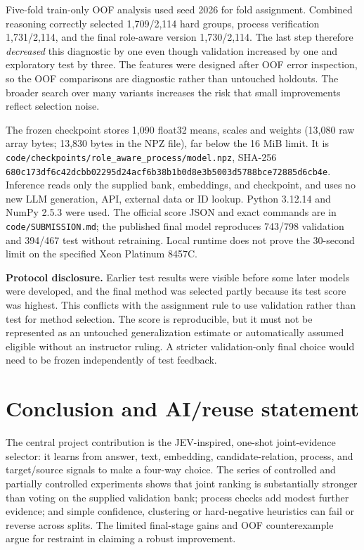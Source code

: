 \documentclass[10pt,a4paper]{article}
\newcommand{\code}[1]{\texttt{#1}}
\begin{document}
Five-fold train-only OOF analysis used seed 2026 for fold assignment. Combined reasoning correctly selected 1,709/2,114 hard groups, process verification 1,731/2,114, and the final role-aware version 1,730/2,114. The last step therefore \emph{decreased} this diagnostic by one even though validation increased by one and exploratory test by three. The features were designed after OOF error inspection, so the OOF comparisons are diagnostic rather than untouched holdouts. The broader search over many variants increases the risk that small improvements reflect selection noise.

The frozen checkpoint stores 1,090 float32 means, scales and weights (13,080 raw array bytes; 13,830 bytes in the NPZ file), far below the 16 MiB limit. It is \code{code/checkpoints/role\_aware\_process/model.npz}, SHA-256 \code{680c173df6c42dcbb02295d24acf6b38b1b0d8e3b5003d5788bce72885d6cb4e}. Inference reads only the supplied bank, embeddings, and checkpoint, and uses no new LLM generation, API, external data or ID lookup. Python 3.12.14 and NumPy 2.5.3 were used. The official score JSON and exact commands are in \code{code/SUBMISSION.md}; the published final model reproduces 743/798 validation and 394/467 test without retraining. Local runtime does not prove the 30-second limit on the specified Xeon Platinum 8457C.

\textbf{Protocol disclosure.} Earlier test results were visible before some later models were developed, and the final method was selected partly because its test score was highest. This conflicts with the assignment rule to use validation rather than test for method selection. The score is reproducible, but it must not be represented as an untouched generalization estimate or automatically assumed eligible without an instructor ruling. A stricter validation-only final choice would need to be frozen independently of test feedback.

\section{Conclusion and AI/reuse statement}
The central project contribution is the JEV-inspired, one-shot joint-evidence selector: it learns from answer, text, embedding, candidate-relation, process, and target/source signals to make a four-way choice. The series of controlled and partially controlled experiments shows that joint ranking is substantially stronger than voting on the supplied validation bank; process checks add modest further evidence; and simple confidence, clustering or hard-negative heuristics can fail or reverse across splits. The limited final-stage gains and OOF counterexample argue for restraint in claiming a robust improvement.
\end{document}
